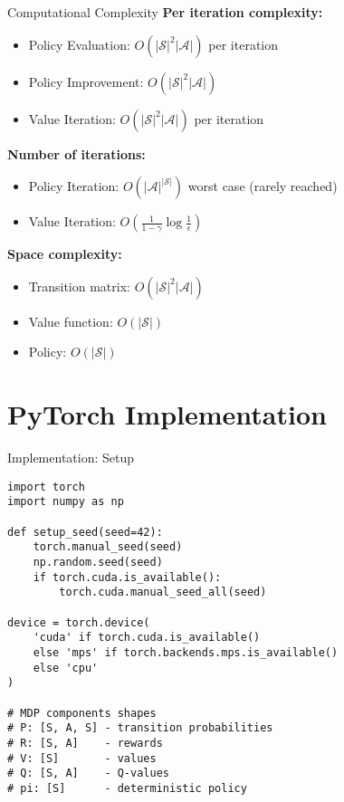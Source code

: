 \documentclass[aspectratio=169,10pt]{beamer}
\begin{document}
\begin{frame}{Computational Complexity}
\textbf{Per iteration complexity:}
\begin{itemize}
    \item Policy Evaluation: $O(|\mathcal{S}|^2 |\mathcal{A}|)$ per iteration
    \item Policy Improvement: $O(|\mathcal{S}|^2 |\mathcal{A}|)$
    \item Value Iteration: $O(|\mathcal{S}|^2 |\mathcal{A}|)$ per iteration
\end{itemize}

\textbf{Number of iterations:}
\begin{itemize}
    \item Policy Iteration: $O(|\mathcal{A}|^{|\mathcal{S}|})$ worst case (rarely reached)
    \item Value Iteration: $O(\frac{1}{1-\gamma} \log \frac{1}{\epsilon})$
\end{itemize}

\textbf{Space complexity:}
\begin{itemize}
    \item Transition matrix: $O(|\mathcal{S}|^2 |\mathcal{A}|)$
    \item Value function: $O(|\mathcal{S}|)$
    \item Policy: $O(|\mathcal{S}|)$
\end{itemize}
\end{frame}

\section{PyTorch Implementation}

\begin{frame}[fragile]{Implementation: Setup}
\begin{lstlisting}
import torch
import numpy as np

def setup_seed(seed=42):
    torch.manual_seed(seed)
    np.random.seed(seed)
    if torch.cuda.is_available():
        torch.cuda.manual_seed_all(seed)

device = torch.device(
    'cuda' if torch.cuda.is_available()
    else 'mps' if torch.backends.mps.is_available()
    else 'cpu'
)

# MDP components shapes
# P: [S, A, S] - transition probabilities
# R: [S, A]    - rewards
# V: [S]       - values
# Q: [S, A]    - Q-values
# pi: [S]      - deterministic policy
\end{lstlisting}
\end{frame}
\end{document}
